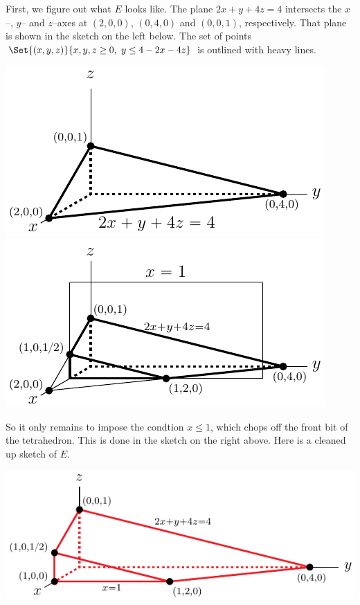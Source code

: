 \begin{solution}
First, we figure out what $E$ looks like. 
The plane $2x+y+4z=4$ intersects the $x$--, $y$-- and $z$--axes
at $(2,0,0)$, $(0,4,0)$ and $(0,0,1)$, respectively.
That plane is shown in the sketch on the left below.
The set of points $\Set{(x,y,z)}{x,y,z\ge 0,\  y\le 4-2x-4z}$
is outlined with heavy lines.
\begin{center}
     \includegraphics[scale=0.99]{fig/OE06D_6a2.pdf}\quad
     \includegraphics[scale=0.99]{fig/OE06D_6a1.pdf}
\end{center}
So it only remains to impose the condtion $x\le 1$, which chops off
the front bit of the tetrahedron. This is done in the sketch on the
right above. Here is a cleaned up sketch of $E$.
\begin{center}
     \includegraphics{fig/OE06D_6a3.pdf}
\end{center}


\end{solution}
